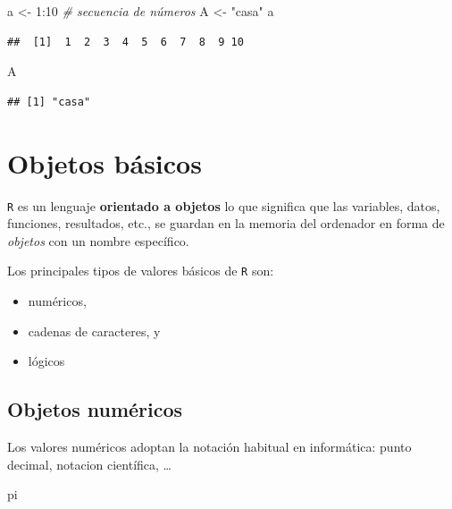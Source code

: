 \documentclass[
]{book}
\newenvironment{Shaded}{\begin{snugshade}}{\end{snugshade}}
\newcommand{\CommentTok}[1]{\textcolor[rgb]{0.56,0.35,0.01}{\textit{#1}}}
\newcommand{\DecValTok}[1]{\textcolor[rgb]{0.00,0.00,0.81}{#1}}
\newcommand{\NormalTok}[1]{#1}
\newcommand{\OtherTok}[1]{\textcolor[rgb]{0.56,0.35,0.01}{#1}}
\newcommand{\SpecialCharTok}[1]{\textcolor[rgb]{0.00,0.00,0.00}{#1}}
\newcommand{\StringTok}[1]{\textcolor[rgb]{0.31,0.60,0.02}{#1}}
\theoremstyle{break}
\begin{document}
\begin{Shaded}
\begin{Highlighting}[]
\NormalTok{a }\OtherTok{\textless{}{-}} \DecValTok{1}\SpecialCharTok{:}\DecValTok{10} \CommentTok{\# secuencia de números}
\NormalTok{A }\OtherTok{\textless{}{-}} \StringTok{"casa"}
\NormalTok{a}
\end{Highlighting}
\end{Shaded}

\begin{verbatim}
##  [1]  1  2  3  4  5  6  7  8  9 10
\end{verbatim}

\begin{Shaded}
\begin{Highlighting}[]
\NormalTok{A}
\end{Highlighting}
\end{Shaded}

\begin{verbatim}
## [1] "casa"
\end{verbatim}

\hypertarget{objetos-buxe1sicos}{%
\section{Objetos básicos}\label{objetos-buxe1sicos}}

\texttt{R} es un lenguaje \textbf{orientado a
objetos} lo que significa que las variables, datos, funciones,
resultados, etc., se guardan en la memoria del ordenador en forma de
\emph{objetos} con un nombre específico.

Los principales tipos de valores básicos de \texttt{R} son:

\begin{itemize}
\item
  numéricos,
\item
  cadenas de caracteres, y
\item
  lógicos
\end{itemize}

\hypertarget{objetos-numuxe9ricos}{%
\subsection{Objetos numéricos}\label{objetos-numuxe9ricos}}

Los valores numéricos adoptan
la notación habitual en informática: punto decimal, notacion científica, \ldots{}

\begin{Shaded}
\begin{Highlighting}[]
\NormalTok{pi}
\end{Highlighting}
\end{Shaded}
\end{document}
